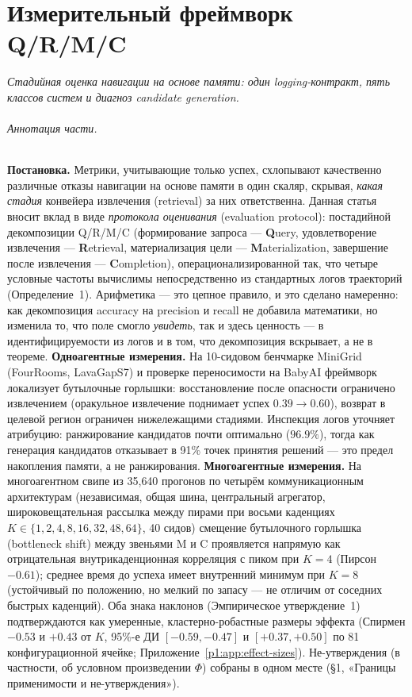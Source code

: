 \documentclass{article}
\begin{document}
\clearpage
\tableofcontents
\clearpage
\part{Измерительный фреймворк Q/R/M/C}
\noindent\textit{Стадийная оценка навигации на основе памяти: один logging-контракт, пять классов систем и диагноз candidate generation.}

\paragraph{Аннотация части.} \textbf{Постановка.} Метрики, учитывающие только успех, схлопывают качественно различные отказы навигации на основе памяти в один скаляр, скрывая, \emph{какая стадия} конвейера извлечения (retrieval) за них ответственна. Данная статья вносит вклад в виде \emph{протокола оценивания} (evaluation protocol): постадийной декомпозиции Q/R/M/C (формирование запроса --- \textbf{Q}uery, удовлетворение извлечения --- \textbf{R}etrieval, материализация цели --- \textbf{M}aterialization, завершение после извлечения --- \textbf{C}ompletion), операционализированной так, что четыре условные частоты вычислимы непосредственно из стандартных логов траекторий (Определение~1). Арифметика --- это цепное правило, и это сделано намеренно: как декомпозиция accuracy на precision и recall не добавила математики, но изменила то, что поле смогло \emph{увидеть}, так и здесь ценность --- в идентифицируемости из логов и в том, что декомпозиция вскрывает, а не в теореме.
\textbf{Одноагентные измерения.} На 10-сидовом бенчмарке MiniGrid (FourRooms, LavaGapS7) и проверке переносимости на BabyAI фреймворк локализует бутылочные горлышки: восстановление после опасности ограничено извлечением (оракульное извлечение поднимает успех $0.39\to0.60$), возврат в целевой регион ограничен нижележащими стадиями. Инспекция логов уточняет атрибуцию: ранжирование кандидатов почти оптимально ($96.9\%$), тогда как генерация кандидатов отказывает в 91\% точек принятия решений --- это предел накопления памяти, а не ранжирования.
\textbf{Многоагентные измерения.} На многоагентном свипе из 35{,}640 прогонов по четырём коммуникационным архитектурам (независимая, общая шина, центральный агрегатор, широковещательная рассылка между пирами при восьми каденциях $K{\in}\{1,2,4,8,16,32,48,64\}$, 40 сидов) смещение бутылочного горлышка (bottleneck shift) между звеньями M и C проявляется напрямую как отрицательная внутрикаденционная корреляция с пиком при $K{=}4$ (Пирсон $-0.61$); среднее время до успеха имеет внутренний минимум при $K{=}8$ (устойчивый по положению, но мелкий по запасу --- не отличим от соседних быстрых каденций). Оба знака наклонов (Эмпирическое утверждение~1) подтверждаются как умеренные, кластерно-робастные размеры эффекта (Спирмен $-0.53$ и $+0.43$ от $K$, 95\%-е ДИ $[-0.59,-0.47]$ и $[+0.37,+0.50]$ по 81 конфигурационной ячейке; Приложение~\ref{p1:app:effect-sizes}). Не-утверждения (в частности, об условном произведении $\Phi$) собраны в одном месте (\S1, «Границы применимости и не-утверждения»).
\end{document}
